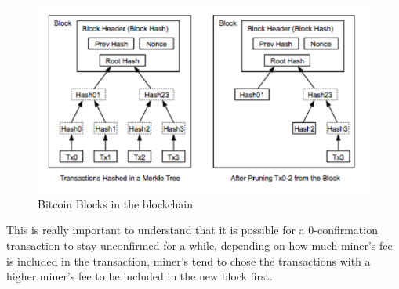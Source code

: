 \begin{figure}
\centering
\includegraphics[width=\linewidth]{fig/bitcoinblocks.png}
  \caption{Bitcoin Blocks in the blockchain}
	\source{~\cite[Nak08]}
\label{fig:bitcoinblocks}
\end{figure}

This is really important to understand that it is possible for a 0-confirmation transaction to stay unconfirmed for a while, depending on how much miner's fee is included in the transaction, miner's tend to chose the transactions with a higher miner's fee to be included in the new block first.





